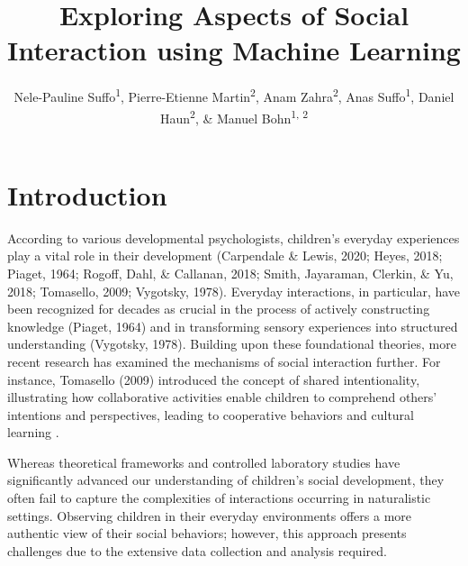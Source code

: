 \documentclass[
  man,floatsintext]{apa6}
\title{Exploring Aspects of Social Interaction using Machine Learning}
\author{Nele-Pauline Suffo\textsuperscript{1}, Pierre-Etienne Martin\textsuperscript{2}, Anam Zahra\textsuperscript{2}, Anas Suffo\textsuperscript{1}, Daniel Haun\textsuperscript{2}, \& Manuel Bohn\textsuperscript{1, 2}}
\date{}
\affiliation{\vspace{0.5cm}\textsuperscript{1} Institute of Psychology in Education, Leuphana University Lüneburg\\\textsuperscript{2} Max Planck Institute for Evolutionary Anthropology}
\begin{document}
\maketitle

\section{Introduction}\label{introduction}

According to various developmental psychologists, children's everyday experiences play a vital role in their development (Carpendale \& Lewis, 2020; Heyes, 2018; Piaget, 1964; Rogoff, Dahl, \& Callanan, 2018; Smith, Jayaraman, Clerkin, \& Yu, 2018; Tomasello, 2009; Vygotsky, 1978). Everyday interactions, in particular, have been recognized for decades as crucial in the process of actively constructing knowledge (Piaget, 1964) and in transforming sensory experiences into structured understanding (Vygotsky, 1978). Building upon these foundational theories, more recent research has examined the mechanisms of social interaction further. For instance, Tomasello (2009) introduced the concept of shared intentionality, illustrating how collaborative activities enable children to comprehend others' intentions and perspectives, leading to cooperative behaviors and cultural learning .

Whereas theoretical frameworks and controlled laboratory studies have significantly advanced our understanding of children's social development, they often fail to capture the complexities of interactions occurring in naturalistic settings. Observing children in their everyday environments offers a more authentic view of their social behaviors; however, this approach presents challenges due to the extensive data collection and analysis required.
\end{document}
